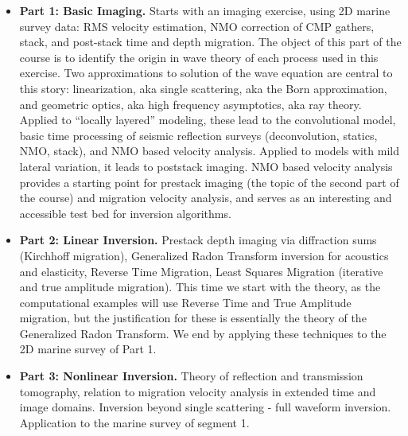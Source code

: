 \begin{itemize}
\item {\bf Part 1: Basic Imaging.} Starts with an imaging exercise, using 2D marine survey data: RMS velocity estimation, NMO correction of CMP gathers, stack, and post-stack time and depth migration. The object of this part of the course is to identify the origin in wave theory of each process used in this exercise. Two approximations to solution of the wave equation are central to this story: linearization, aka single scattering, aka the Born approximation, and geometric optics, aka high frequency asymptotics, aka ray theory. Applied to ``locally layered'' modeling, these lead to the convolutional model, basic time processing of seismic reflection surveys (deconvolution, statics, NMO, stack), and NMO based velocity analysis. Applied to models with mild lateral variation, it leads to poststack imaging. NMO based velocity analysis provides a starting point for prestack imaging (the topic of the second part of the course) and migration velocity analysis, and serves as an interesting and accessible test bed for inversion algorithms.  

\item {\bf Part 2: Linear Inversion.} Prestack depth imaging via diffraction sums (Kirchhoff migration), Generalized Radon Transform inversion for acoustics and elasticity, Reverse Time Migration, Least Squares Migration (iterative and true amplitude migration). This time we start with the theory, as the computational examples will use Reverse Time and True Amplitude migration, but the justification for these is essentially the theory of the Generalized Radon Transform. We end by applying these techniques to the 2D marine survey of Part 1.

\item {\bf Part 3: Nonlinear Inversion.} Theory of reflection and transmission tomography, relation to migration velocity analysis in extended time and image domains. Inversion beyond single scattering - full waveform inversion.  Application to the marine survey of segment 1. 

\end{itemize}


